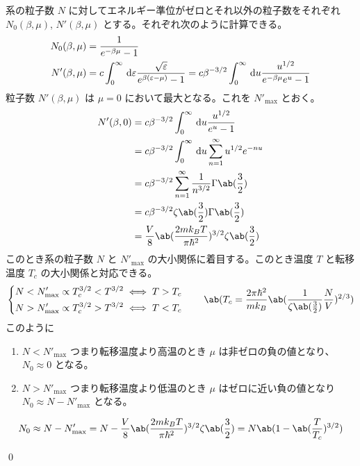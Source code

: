 \documentclass[uplatex,diffipdfmx,a4paper,11pt]{jlreq}
\makeatletter
\numberwithin{equation}{section}
\theoremstyle{definition}
\renewenvironment{proof}[1][\proofname]{\par
  \normalfont
  \topsep6\p@\@plus6\p@ \trivlist
  \item[\hskip\labelsep{\bfseries #1}\@addpunct{\bfseries}]\ignorespaces\quad\par
}{%
  \qed\endtrivlist\@endpefalse
}
\renewcommand\proofname{証明}
\makeatother
\begin{document}
\begin{proof}
  系の粒子数 $N$ に対してエネルギー準位がゼロとそれ以外の粒子数をそれぞれ $N_0(\beta, \mu)$, $N'(\beta, \mu)$ とする。それぞれ次のように計算できる。
  \begin{align}
    N_0(\beta, \mu) & = \frac{1}{e^{-\beta\mu} - 1}                                                                                                                                                \\
    N'(\beta, \mu)  & = c\int_{0}^{\infty}\dl{\varepsilon}\frac{\sqrt{\varepsilon}}{e^{\beta(\varepsilon - \mu)} - 1} = c\beta^{-3/2}\int_{0}^{\infty}\dl{u}\frac{u^{1/2}}{e^{-\beta\mu}e^{u} - 1}
  \end{align}
  粒子数 $N'(\beta, \mu)$ は $\mu = 0$ において最大となる。これを $N'_{\max}$ とおく。
  \begin{align}
    N'(\beta, 0) & = c\beta^{-3/2}\int_{0}^{\infty}\dl{u}\frac{u^{1/2}}{e^{u} - 1}           \\
                 & = c\beta^{-3/2}\int_{0}^{\infty}\dl{u}\sum_{n=1}^{\infty}u^{1/2}e^{-nu}   \\
                 & = c\beta^{-3/2}\sum_{n=1}^{\infty}\frac{1}{n^{3/2}}\Gamma\ab(\frac{3}{2}) \\
                 & = c\beta^{-3/2}\zeta\ab(\frac{3}{2})\Gamma\ab(\frac{3}{2})                \\
                 & = \frac{V}{8}\ab(\frac{2mk_BT}{\pi\hbar^2})^{3/2}\zeta\ab(\frac{3}{2})
  \end{align}
  このとき系の粒子数 $N$ と $N'_{\max}$ の大小関係に着目する。このとき温度 $T$ と転移温度 $T_c$ の大小関係と対応できる。
  \begin{align}
    \begin{dcases}
      N   < N'_{\max} \propto T_c^{3/2} < T^{3/2} \iff T > T_c \\
      N   > N'_{\max} \propto T_c^{3/2} > T^{3/2} \iff T < T_c
    \end{dcases} \qquad
    \ab(T_c = \frac{2\pi\hbar^2}{mk_B}\ab(\frac{1}{\zeta\ab(\frac{3}{2})}\frac{N}{V})^{2/3})
  \end{align}
  このように
  \begin{enumerate}
    \item $N < N'_{\max}$ つまり転移温度より高温のとき $\mu$ は非ゼロの負の値となり、$N_0 \approx 0$ となる。
    \item $N > N'_{\max}$ つまり転移温度より低温のとき $\mu$ はゼロに近い負の値となり $N_0 \approx N - N'_{\max}$ となる。
  \end{enumerate}
  \begin{align}
    N_0 \approx N - N'_{\max} = N - \frac{V}{8}\ab(\frac{2mk_BT}{\pi\hbar^2})^{3/2}\zeta\ab(\frac{3}{2}) = N\ab(1 - \ab(\frac{T}{T_c})^{3/2})
  \end{align}


\end{proof}
\end{document}
